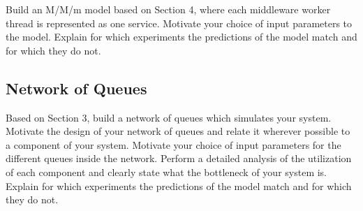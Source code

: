 \documentclass[11pt,a4paper]{article}
\begin{document}
Build an M/M/m model based on Section 4, where each middleware worker thread is represented as one service.  Motivate your choice of input parameters to the model. Explain for which experiments the predictions of the model match and for which they do not.

\subsection{Network of Queues}

Based on Section 3, build a network of queues which simulates your system. Motivate the design of your network of queues and relate it wherever possible to a component of your system. Motivate your choice of input parameters for the different queues inside the network. Perform a detailed analysis of the utilization of each component and clearly state what the bottleneck of your system is. Explain for which experiments the predictions of the model match and for which they do not.
\end{document}
